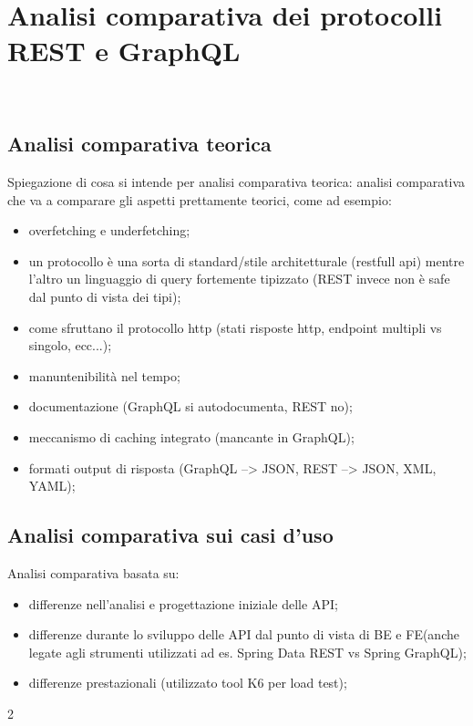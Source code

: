 
\chapter{Analisi comparativa dei protocolli REST e GraphQL}
\label{cap:analisi-comparativa}

\\

\section{Analisi comparativa teorica}
Spiegazione di cosa si intende per analisi comparativa teorica: analisi comparativa che va a comparare gli aspetti prettamente teorici, come ad esempio:
\begin{itemize}
  \item overfetching e underfetching;
  \item un protocollo è una sorta di standard/stile architetturale (restfull api)     mentre l'altro un linguaggio di query fortemente tipizzato (REST invece non è safe dal punto di vista dei tipi);
  \item come sfruttano il protocollo http (stati risposte http, endpoint multipli vs singolo, ecc...);
  \item manuntenibilità nel tempo;
  \item documentazione (GraphQL si autodocumenta, REST no);
  \item meccanismo di caching integrato (mancante in GraphQL);
  \item formati output di risposta (GraphQL --> JSON, REST --> JSON, XML, YAML);
\end{itemize}
\section{Analisi comparativa sui casi d'uso}
Analisi comparativa basata su:
\begin{itemize}
  \item differenze nell'analisi e progettazione iniziale delle API;
  \item differenze durante lo sviluppo delle API dal punto di vista di BE e FE(anche legate agli strumenti utilizzati ad es. Spring Data REST vs Spring GraphQL);
  \item differenze prestazionali (utilizzato tool K6 per load test);
\end{itemize}2
